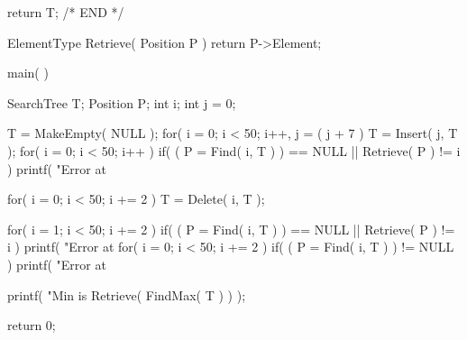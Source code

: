 \documentclass[12pt, a4paper]{article}
\begin{document}
\begin{code}
{	return T;
}
/* END */

ElementType Retrieve( Position P )
{
	return P->Element;
}

main( )
{
    SearchTree T;
    Position P;
    int i;
    int j = 0;

    T = MakeEmpty( NULL );
    for( i = 0; i < 50; i++, j = ( j + 7 ) %
        T = Insert( j, T );
    for( i = 0; i < 50; i++ )
        if( ( P = Find( i, T ) ) == NULL || Retrieve( P ) != i )
            printf( "Error at %

    for( i = 0; i < 50; i += 2 )
        T = Delete( i, T );

    for( i = 1; i < 50; i += 2 )
        if( ( P = Find( i, T ) ) == NULL || Retrieve( P ) != i )
            printf( "Error at %
    for( i = 0; i < 50; i += 2 )
        if( ( P = Find( i, T ) ) != NULL )
            printf( "Error at %

    printf( "Min is %
               Retrieve( FindMax( T ) ) );

    return 0;
}
\end{code}
\pagebreak
\end{document}

